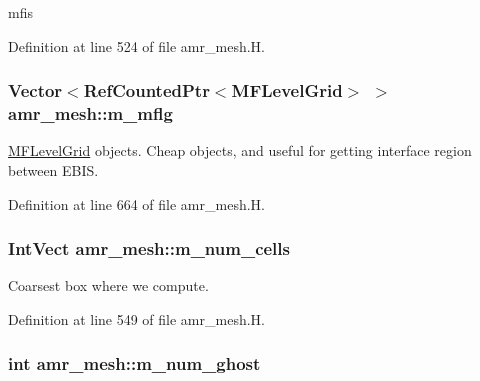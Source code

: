 mfis 



Definition at line 524 of file amr\+\_\+mesh.\+H.

\subsubsection[{\texorpdfstring{m\+\_\+mflg}{m_mflg}}]{\setlength{\rightskip}{0pt plus 5cm}Vector$<$Ref\+Counted\+Ptr$<${\bf M\+F\+Level\+Grid}$>$ $>$ amr\+\_\+mesh\+::m\+\_\+mflg\hspace{0.3cm}{\ttfamily [protected]}}\hypertarget{classamr__mesh_a97c0a341d220e43511ef57b97153dd0a}{}\label{classamr__mesh_a97c0a341d220e43511ef57b97153dd0a}


\hyperlink{classMFLevelGrid}{M\+F\+Level\+Grid} objects. Cheap objects, and useful for getting interface region between E\+B\+IS\textquotesingle{}. 



Definition at line 664 of file amr\+\_\+mesh.\+H.

\subsubsection[{\texorpdfstring{m\+\_\+num\+\_\+cells}{m_num_cells}}]{\setlength{\rightskip}{0pt plus 5cm}Int\+Vect amr\+\_\+mesh\+::m\+\_\+num\+\_\+cells\hspace{0.3cm}{\ttfamily [protected]}}\hypertarget{classamr__mesh_af038a31e02563d072e56a0c28030755a}{}\label{classamr__mesh_af038a31e02563d072e56a0c28030755a}


Coarsest box where we compute. 



Definition at line 549 of file amr\+\_\+mesh.\+H.

\subsubsection[{\texorpdfstring{m\+\_\+num\+\_\+ghost}{m_num_ghost}}]{\setlength{\rightskip}{0pt plus 5cm}int amr\+\_\+mesh\+::m\+\_\+num\+\_\+ghost\hspace{0.3cm}{\ttfamily [protected]}}\hypertarget{classamr__mesh_a688410f30cd6b8b1fdc665bc1c19fa83}{}\label{classamr__mesh_a688410f30cd6b8b1fdc665bc1c19fa83}


